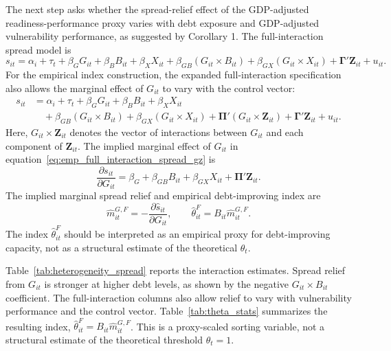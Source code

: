 The next step asks whether the spread-relief effect of the GDP-adjusted readiness-performance proxy varies with debt exposure and GDP-adjusted vulnerability performance, as suggested by Corollary 1. The full-interaction spread model is
\begin{equation}
s_{it}
=
\alpha_i+\tau_t
+\beta_GG_{it}
+\beta_BB_{it}
+\beta_XX_{it}
+\beta_{GB}(G_{it}\times B_{it})
+\beta_{GX}(G_{it}\times X_{it})
+\boldsymbol{\Gamma}'\mathbf{Z}_{it}
+u_{it}.
\label{eq:emp_full_interaction_spread}
\end{equation}
For the empirical index construction, the expanded full-interaction specification also allows the marginal effect of $G_{it}$ to vary with the control vector:
\begin{equation}
\begin{aligned}
s_{it}
&=
\alpha_i+\tau_t
+\beta_GG_{it}
+\beta_BB_{it}
+\beta_XX_{it} \\
&\quad
+\beta_{GB}(G_{it}\times B_{it})
+\beta_{GX}(G_{it}\times X_{it})
+\boldsymbol{\Pi}'(G_{it}\times\mathbf{Z}_{it})
+\boldsymbol{\Gamma}'\mathbf{Z}_{it}
+u_{it}.
\end{aligned}
\label{eq:emp_full_interaction_spread_gz}
\end{equation}
Here, $G_{it}\times\mathbf{Z}_{it}$ denotes the vector of interactions between $G_{it}$ and each component of $\mathbf{Z}_{it}$. The implied marginal effect of $G_{it}$ in equation~\eqref{eq:emp_full_interaction_spread_gz} is
\begin{equation}
\frac{\partial s_{it}}{\partial G_{it}}
=
\beta_G
+\beta_{GB}B_{it}
+\beta_{GX}X_{it}
+\boldsymbol{\Pi}'\mathbf{Z}_{it}.
\label{eq:emp_marginal_spread}
\end{equation}
The implied marginal spread relief and empirical debt-improving index are
\begin{equation}
\widehat m^{G,F}_{it}
=
-
\frac{\partial \widehat s_{it}}{\partial G_{it}},
\qquad
\widehat\theta^F_{it}
=
B_{it}\widehat m^{G,F}_{it}.
\label{eq:emp_theta}
\end{equation}
The index $\widehat\theta^F_{it}$ should be interpreted as an empirical proxy for debt-improving capacity, not as a structural estimate of the theoretical $\theta_t$.

Table~\ref{tab:heterogeneity_spread} reports the interaction estimates. Spread relief from $G_{it}$ is stronger at higher debt levels, as shown by the negative $G_{it}\times B_{it}$ coefficient. The full-interaction columns also allow relief to vary with vulnerability performance and the control vector. Table~\ref{tab:theta_stats} summarizes the resulting index, $\widehat\theta^F_{it}=B_{it}\widehat m^{G,F}_{it}$. This is a proxy-scaled sorting variable, not a structural estimate of the theoretical threshold $\theta_t=1$.

